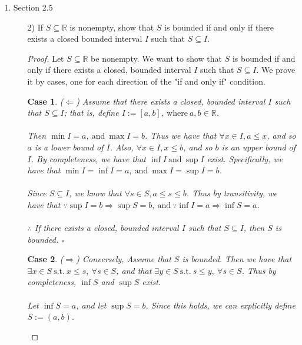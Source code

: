 \documentclass[12pt,letterpaper]{article}
\theoremstyle{case}
\newtheorem{case}{Case}
\begin{document}
\begin{enumerate}
\begin{enumerate}
\begin{proof}
			Let $y > 0$. By Corollary 2.4.5, $\exists n \in \mathbb{N}$ such that $0 < \frac{1}{n} < y$.\\ Since $n < 2^n$, we have $$0 < \frac{1}{2^n} < \frac{1}{n} < y$$
		\end{proof}
		\end{enumerate}
	\item Section 2.5
	\begin{enumerate}
		\item[2)] If $S\subseteq\mathbb{R}$ is nonempty, show that $S$ is bounded if and only if there exists a closed bounded interval $I$ such that $S \subseteq I$.
		\begin{proof}
			Let $S \subseteq \mathbb{R}$ be nonempty. We want to show that $S$ is bounded if and only if there exists a closed, bounded interval $I$ such that $S \subseteq I$. We prove it by cases, one for each direction of the "if and only if" condition.
			\begin{case} ($\Leftarrow$)
				Assume that there exists a closed, bounded interval $I$ such that $S \subseteq I$; that is, define $I := [a, b],\ \text{where}\ a,b \in \mathbb{R}$. 
				\\\\Then $\min I = a,\ \text{and}\ \max I = b$. Thus we have that $\forall x \in I, a \leq x$, and so $a$ is a lower bound of $I$. Also, $\forall x \in I, x \leq b$, and so $b$ is an upper bound of $I$. By completeness, we have that $\inf I\ \text{and}\ \sup I$ exist. Specifically, we have that $\min I = \inf I = a,\ \text{and}\ \max I = \sup I = b$.
				\\\\Since $S \subseteq I$, we know that $\forall s \in S, a \leq s \leq b$. Thus by transitivity, we have that $\because \sup I = b \Rightarrow \sup S = b,\ \text{and}\ \because \inf I = a \Rightarrow \inf S = a$.
				\\\\$\therefore$ If there exists a closed, bounded interval $I$ such that $S \subseteq I$, then $S$ is bounded. $\square$
			\end{case}
			\begin{case} ($\Rightarrow$)
				Conversely, Assume that $S$ is bounded. Then we have that $\exists x \in S\ \text{s.t.}\ x \leq s,\ \forall s \in S$, and that $\exists y \in S\ \text{s.t.}\ s \leq y,\ \forall s \in S$. Thus by completeness, $\inf S$ and $\sup S$ exist.
				\\\\Let $\inf S = a$, and let $\sup S = b$. Since this holds, we can explicitly define $S := (a, b)$.

\end{case}
\end{proof}
\end{enumerate}
\end{enumerate}
\end{document}
